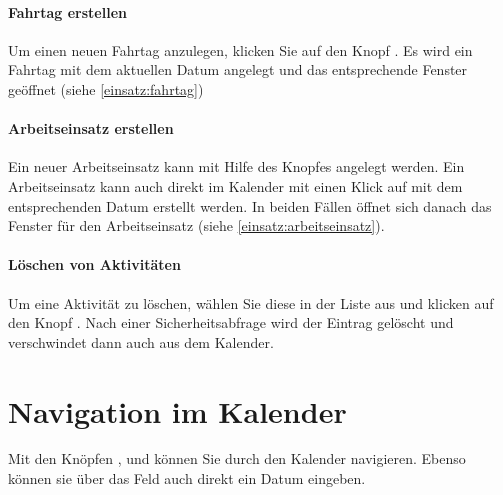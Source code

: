 \paragraph{Fahrtag erstellen}
Um einen neuen Fahrtag anzulegen, klicken Sie auf den Knopf .
Es wird ein Fahrtag mit dem aktuellen Datum angelegt und das entsprechende Fenster geöffnet (siehe \cref{einsatz:fahrtag})

\paragraph{Arbeitseinsatz erstellen}
Ein neuer Arbeitseinsatz kann mit Hilfe des Knopfes  angelegt werden.
Ein Arbeitseinsatz kann auch direkt im Kalender mit einen Klick auf \button{+} mit dem entsprechenden Datum erstellt werden.
In beiden Fällen öffnet sich danach das Fenster für den Arbeitseinsatz
(siehe \cref{einsatz:arbeitseinsatz}).




\paragraph{Löschen von Aktivitäten}
Um eine Aktivität zu löschen, wählen Sie diese in der Liste aus
und klicken auf den Knopf .
Nach einer Sicherheitsabfrage wird der Eintrag gelöscht und verschwindet dann auch aus dem Kalender.



\section{Navigation im Kalender}\label{einsatz:kalender:navigieren}
Mit den Knöpfen ,  und  können Sie durch den Kalender navigieren.
Ebenso können sie über das Feld auch direkt ein Datum eingeben.



